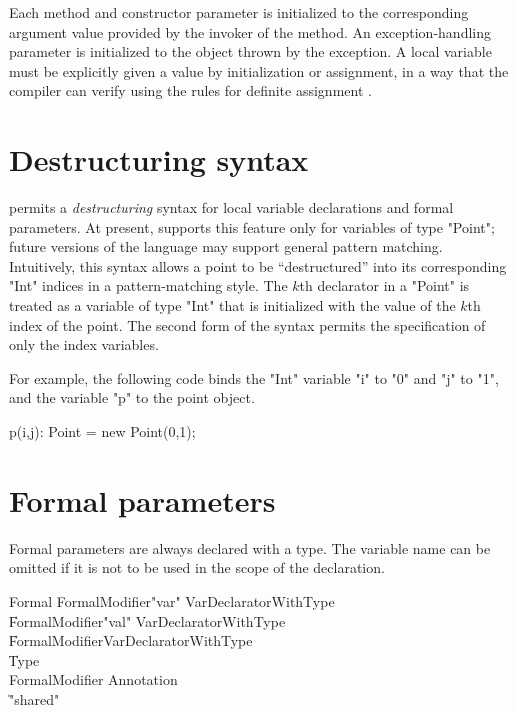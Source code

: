 Each method and constructor parameter is initialized to the
corresponding argument value provided by the invoker of the method. An
exception-handling parameter is initialized to the object thrown by
the exception. A local variable must be explicitly given a value by
initialization or assignment, in a way that the compiler can verify
using the rules for definite assignment \cite[\S~16]{jls2}.

\section{Destructuring syntax}
\Xten{} permits a \emph{destructuring} syntax for local variable
declarations and formal parameters.
At present, \XtenCurrVer{} supports this feature only for
variables of
type \xcd"Point"; future versions of the language may support 
general pattern matching.
Intuitively, this syntax allows a
point to be ``destructured'' into its corresponding \xcd"Int" 
indices in a pattern-matching style.
The $k$th declarator in a \xcd"Point"
is treated as a variable of type \xcd"Int"
that is initialized with the value of the $k$th index of the point. 
The second form of the syntax permits the specification of only
the index variables.

For example, the following code binds the \xcd"Int" variable \xcd"i" to
\xcd"0" and \xcd"j" to \xcd"1", and the variable \xcd"p" to the
point object.
\begin{xten}
p(i,j): Point = new Point(0,1);
\end{xten}

\section{Formal parameters}
Formal parameters are always declared with a type.
The variable name can be omitted if it is not to be used in the
scope of the declaration.

\begin{grammar}
Formal
        \: FormalModifier\star \xcd"var" VarDeclaratorWithType \\
        \| FormalModifier\star \xcd"val" VarDeclaratorWithType \\
        \| FormalModifier\star VarDeclaratorWithType \\
        \| Type \\
FormalModifier \: Annotation \\
              \| \xcd"shared" \\
\end{grammar}

